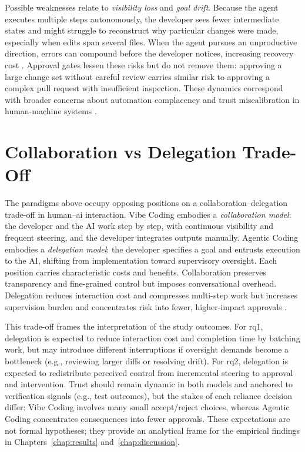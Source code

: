 Possible weaknesses relate to \emph{visibility loss} and \emph{goal drift}. Because the agent executes multiple steps autonomously, the developer sees fewer intermediate states and might struggle to reconstruct why particular changes were made, especially when edits span several files. When the agent pursues an unproductive direction, errors can compound before the developer notices, increasing recovery cost \parencite{perry2023insecure}. Approval gates lessen these risks but do not remove them: approving a large change set without careful review carries similar risk to approving a complex pull request with insufficient inspection. These dynamics correspond with broader concerns about automation complacency and trust miscalibration in human-machine systems \parencite{leeSee2004trust}.


\section{Collaboration vs Delegation Trade-Off}
\label{sec:bg-tradeoff}

The paradigms above occupy opposing positions on a collaboration--delegation trade-off in human--\gls{ai} interaction. Vibe Coding embodies a \emph{collaboration model}: the developer and the AI work step by step, with continuous visibility and frequent steering, and the developer integrates outputs manually. Agentic Coding embodies a \emph{delegation model}: the developer specifies a goal and entrusts execution to the AI, shifting from implementation toward supervisory oversight. Each position carries characteristic costs and benefits. Collaboration preserves transparency and fine-grained control but imposes conversational overhead. Delegation reduces interaction cost and compresses multi-step work but increases supervision burden and concentrates risk into fewer, higher-impact approvals \parencite{sarkar2025codewithme, parasuraman2000model}.

This trade-off frames the interpretation of the study outcomes. For \gls{rq1}, delegation is expected to reduce interaction cost and completion time by batching work, but may introduce different interruptions if oversight demands become a bottleneck (e.g., reviewing larger diffs or resolving drift). For \gls{rq2}, delegation is expected to redistribute perceived control from incremental steering to approval and intervention. Trust should remain dynamic in both models and anchored to verification signals (e.g., test outcomes), but the stakes of each reliance decision differ: Vibe Coding involves many small accept/reject choices, whereas Agentic Coding concentrates consequences into fewer approvals. These expectations are not formal hypotheses; they provide an analytical frame for the empirical findings in Chapters~\ref{chap:results} and~\ref{chap:discussion}.

